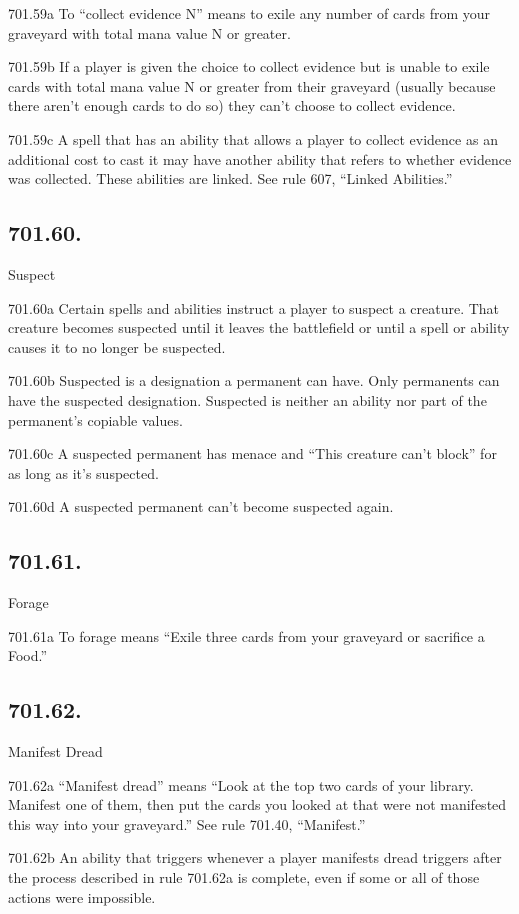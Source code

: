 701.59a To “collect evidence N” means to exile any number of cards from your graveyard with total mana value N or greater.

701.59b If a player is given the choice to collect evidence but is unable to exile cards with total mana value N or greater from their graveyard (usually because there aren’t enough cards to do so) they can’t choose to collect evidence.

701.59c A spell that has an ability that allows a player to collect evidence as an additional cost to cast it may have another ability that refers to whether evidence was collected. These abilities are linked. See rule 607, “Linked Abilities.”

\subsection*{701.60.}
Suspect

701.60a Certain spells and abilities instruct a player to suspect a creature. That creature becomes suspected until it leaves the battlefield or until a spell or ability causes it to no longer be suspected.

701.60b Suspected is a designation a permanent can have. Only permanents can have the suspected designation. Suspected is neither an ability nor part of the permanent’s copiable values.

701.60c A suspected permanent has menace and “This creature can’t block” for as long as it’s suspected.

701.60d A suspected permanent can’t become suspected again.

\subsection*{701.61.}
Forage

701.61a To forage means “Exile three cards from your graveyard or sacrifice a Food.”

\subsection*{701.62.}
Manifest Dread

701.62a “Manifest dread” means “Look at the top two cards of your library. Manifest one of them, then put the cards you looked at that were not manifested this way into your graveyard.” See rule 701.40, “Manifest.”

701.62b An ability that triggers whenever a player manifests dread triggers after the process described in rule 701.62a is complete, even if some or all of those actions were impossible.

